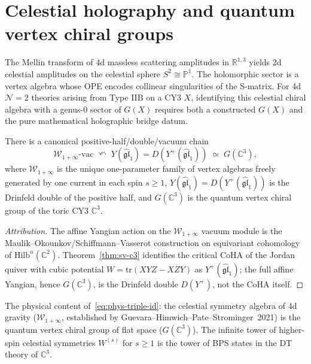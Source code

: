 \section{Celestial holography and quantum vertex chiral groups}
\label{sec:phys-cel-holography}

The Mellin transform of 4d massless scattering amplitudes in $\mathbb{R}^{1,3}$ yields 2d celestial amplitudes on the celestial sphere $S^2 \cong \mathbb{P}^1$. The holomorphic sector is a vertex algebra whose OPE encodes collinear singularities of the S-matrix. For 4d $\mathcal{N}=2$ theories arising from Type IIB on a CY3 $X$, identifying this celestial chiral algebra with a genus-$0$ sector of $G(X)$ requires both a constructed $G(X)$ and the pure mathematical holographic bridge datum.

\begin{theorem}
\label{thm:phys-cel-triple-id}
There is a canonical positive-half/double/vacuum chain
\begin{equation}\label{eq:phys-triple-id}
\mathcal{W}_{1+\infty}\text{-vac} \;\curvearrowleft\; Y(\widehat{\mathfrak{gl}}_1)=D(Y^+(\widehat{\mathfrak{gl}}_1)) \;\simeq\; G(\mathbb{C}^3),
\end{equation}
where $\mathcal{W}_{1+\infty}$ is the unique one-parameter family of vertex algebras freely generated by one current in each spin $s \geq 1$, $Y(\widehat{\mathfrak{gl}}_1)=D(Y^+(\widehat{\mathfrak{gl}}_1))$ is the Drinfeld double of the positive half, and $G(\mathbb{C}^3)$ is the quantum vertex chiral group of the toric CY3 $\mathbb{C}^3$.
\end{theorem}

\begin{proof}[Attribution]
The affine Yangian action on the $\mathcal{W}_{1+\infty}$ vacuum module is the Maulik--Okounkov/Schiffmann--Vasserot construction on equivariant cohomology of $\mathrm{Hilb}^n(\mathbb{C}^2)$. Theorem~\ref{thm:sv-c3} identifies the critical CoHA of the Jordan quiver with cubic potential $W = \mathrm{tr}(XYZ - XZY)$ as $Y^+(\widehat{\mathfrak{gl}}_1)$; the full affine Yangian, hence $G(\mathbb{C}^3)$, is the Drinfeld double $D(Y^+)$, not the CoHA itself.
\end{proof}

The physical content of~\eqref{eq:phys-triple-id}: the celestial symmetry algebra of 4d gravity ($\mathcal{W}_{1+\infty}$, established by Guevara--Himwich--Pate--Strominger~2021) is the quantum vertex chiral group of flat space ($G(\mathbb{C}^3)$). The infinite tower of higher-spin celestial symmetries $W^{(s)}$ for $s \geq 1$ is the tower of BPS states in the DT theory of $\mathbb{C}^3$.

